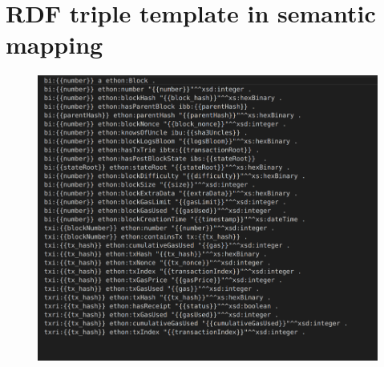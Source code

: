 \chapter{RDF triple template in semantic mapping }
\begin{center}
	\begin{figure}[htb!]
		
		\begin{minipage}{0.43\linewidth}
			\centering
			\includegraphics[width=1.95\textwidth]{images/chap03_triple_template.png}
		\end{minipage}
		
	\end{figure}
	
\end{center}